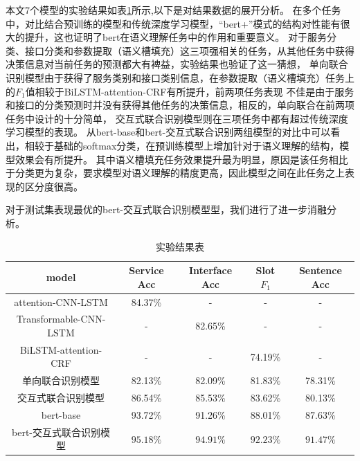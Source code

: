 本文7个模型的实验结果如表\ref{tab:jieguo}所示,以下是对结果数据的展开分析。
在多个任务中，对比结合预训练的模型和传统深度学习模型，“bert+”模式的结构对性能有很大的提升，这也证明了bert在语义理解任务中的作用和重要意义。
对于服务分类、接口分类和参数提取（语义槽填充）这三项强相关的任务，从其他任务中获得决策信息对当前任务的预测都大有裨益，实验结果也验证了这一猜想，
单向联合识别模型由于获得了服务类别和接口类别信息，在参数提取（语义槽填充）任务上的$F_1$值相较于BiLSTM-attention-CRF有所提升，前两项任务表现
不佳是由于服务和接口的分类预测时并没有获得其他任务的决策信息，相反的，单向联合在前两项任务中设计的十分简单，
交互式联合识别模型则在三项任务中都有超过传统深度学习模型的表现。
从bert-base和bert-交互式联合识别两组模型的对比中可以看出，相较于基础的softmax分类，在预训练模型上增加针对于语义理解的结构，模型效果会有所提升。
其中语义槽填充任务效果提升最为明显，原因是该任务相比于分类更为复杂，要求模型对语义理解的精度更高，因此模型之间在此任务之上表现的区分度很高。

对于测试集表现最优的bert-交互式联合识别模型型，我们进行了进一步消融分析。

\begin{table}[htb]
  \centering
  \caption{实验结果表}
  \label{tab:jieguo}
\begin{tabular}{c|cccc}
\hline
 model&Service Acc&Interface Acc&Slot $F_1$&Sentence Acc\\
 \hline
 attention-CNN-LSTM&84.37\%&-&-&-\\
 Transformable-CNN-LSTM&-&82.65\%&-&-\\
 BiLSTM-attention-CRF&-&-&74.19\%&-\\
 单向联合识别模型&82.13\%&82.09\%&81.83\%&78.31\%\\
 交互式联合识别模型&86.54\%&85.53\%&83.62\%&80.13\%\\
 bert-base&93.72\%&91.26\%&88.01\%&87.63\%\\
 bert-交互式联合识别模型&$\mathbf{95.18\%}$&$\mathbf{94.91}\%$&$\mathbf{92.23}\%$&$\mathbf{91.47}\%$\\
\hline
\end{tabular}
\end{table}
